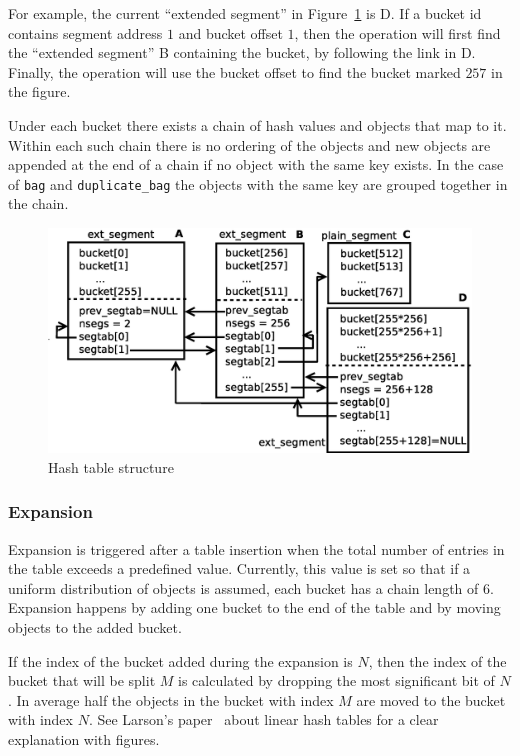 \documentclass[aps,pre,preprint,nofootinbib]{revtex4}
\begin{document}
For example, the current ``extended segment'' in Figure~\ref{fig:hash_table_structure} is D.
If a bucket id contains segment address $1$ and bucket offset $1$, then the operation will first find the ``extended segment'' B containing the bucket, by following the link in D. Finally, the operation will use the bucket offset to find the bucket marked $257$ in the figure.

Under each bucket there exists a chain of hash values and objects that map to it.
Within each such chain there is no ordering of the objects and new objects are appended at the end of a chain if no object with the same key exists.
In the case of \verb|bag| and \verb|duplicate_bag| the objects with the same key are grouped together in the chain.

\begin{figure}[htb]
  \centering
  \includegraphics[width=1.0\textwidth]{hash_table_structure.eps}
  \caption{Hash table structure}
  \label{fig:hash_table_structure}
\end{figure}

\subsubsection{Expansion}

Expansion is triggered after a table insertion when the total number of entries in the table exceeds a predefined value.
Currently, this value is set so that if a uniform distribution of objects is assumed, each bucket has a chain length of 6.
Expansion happens by adding one bucket to the end of the table and by moving objects to the added bucket.

If the index of the bucket added during the expansion is $N$, then the index of the bucket that will be split $M$ is calculated by dropping the most significant bit of $N$.
In average half the objects in the bucket with index  $M$ are moved to the bucket with index $N$.
See Larson's paper~\cite{Larson} about linear hash tables for a clear explanation with figures.
\end{document}
